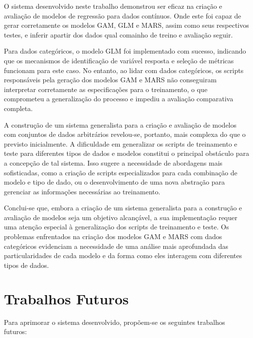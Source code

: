 \documentclass[
    12pt,               %
    openright,          %
    oneside,            %
    a4paper,            %
    english,            %
    brazil              %
    ]{abntex2}
\begin{document}
O sistema desenvolvido neste trabalho demonstrou ser eficaz na criação e avaliação de modelos de regressão para dados 
contínuos. Onde este foi capaz de gerar corretamente os modelos GAM, GLM e MARS, assim como seus respectivos testes, e
inferir apartir dos dados qual comainho de treino e avaliação seguir.

Para dados categóricos, o modelo GLM foi implementado com sucesso, indicando que os mecanismos de identificação 
de variável resposta e seleção de métricas funcionam para este caso. No entanto, ao lidar com dados categóricos, os scripts 
responsáveis pela geração dos modelos GAM e MARS não conseguiram interpretar corretamente as especificações para o 
treinamento, o que comprometeu a generalização do processo e impediu a avaliação comparativa completa.

A construção de um sistema generalista para a criação e avaliação de modelos com conjuntos de dados arbitrários revelou-se, 
portanto, mais complexa do que o previsto inicialmente. A dificuldade em generalizar os scripts de treinamento e teste 
para diferentes tipos de dados e modelos constitui o principal obstáculo para a concepção de tal sistema. Isso sugere a 
necessidade de abordagens mais sofisticadas, como a criação de scripts especializados para cada combinação de modelo e tipo 
de dado, ou o desenvolvimento de uma nova abstração para gerenciar as informações necessárias ao treinamento.

Conclui-se que, embora a criação de um sistema generalista para a construção e avaliação de modelos seja um objetivo 
alcançável, a sua implementação requer uma atenção especial à generalização dos scripts de treinamento e teste. 
Os problemas enfrentados na criação dos modelos GAM e MARS com dados categóricos evidenciam a necessidade de uma 
análise mais aprofundada das particularidades de cada modelo e da forma como eles interagem com diferentes tipos de dados.


\section{Trabalhos Futuros}

Para aprimorar o sistema desenvolvido, propõem-se os seguintes trabalhos futuros:
\end{document}

